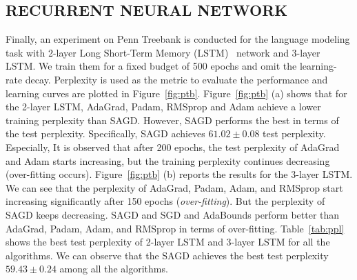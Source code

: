 \documentclass[11pt]{article}
\begin{document}
\vspace{-0.05in}
\subsection{RECURRENT NEURAL NETWORK}\label{subsec: rnn}

\begin{table}[t]
\small
\caption{ Test Perplexity of LSTMs on Penn Treebank. Bold number indicates the best result.}\label{tab:ppl}
\end{table}

Finally, an experiment on Penn Treebank is conducted for the language modeling task with 2-layer Long Short-Term Memory (LSTM)~\citep{stni2018} network and 3-layer LSTM. We train them for a fixed budget of 500 epochs and omit the learning-rate decay. Perplexity is used as the metric to evaluate the performance and learning curves are plotted in Figure~\ref{fig:ptb}. 
Figure~\ref{fig:ptb} (a) shows that for the 2-layer LSTM, AdaGrad, Padam, RMSprop and Adam achieve a lower training perplexity than SAGD. However, SAGD performs the best in terms of the test perplexity. Specifically, SAGD achieves $61.02 \pm 0.08$ test perplexity. 
Especially, It is observed that after 200 epochs, the test perplexity of AdaGrad and Adam starts increasing, but the training perplexity continues decreasing (over-fitting occurs).  
Figure~\ref{fig:ptb} (b) reports the results for the 3-layer LSTM. We can see that the perplexity of AdaGrad, Padam, Adam, and RMSprop start increasing significantly after 150 epochs (\emph{over-fitting}). But the perplexity of SAGD keeps decreasing. SAGD and SGD and AdaBounds perform better than AdaGrad, Padam, Adam, and RMSprop in terms of over-fitting.
Table~\ref{tab:ppl} shows the best test perplexity of 2-layer LSTM and 3-layer LSTM for all the algorithms. We can observe that the SAGD achieves the best test perplexity $59.43 \pm 0.24$ among all the algorithms. 
\end{document}
